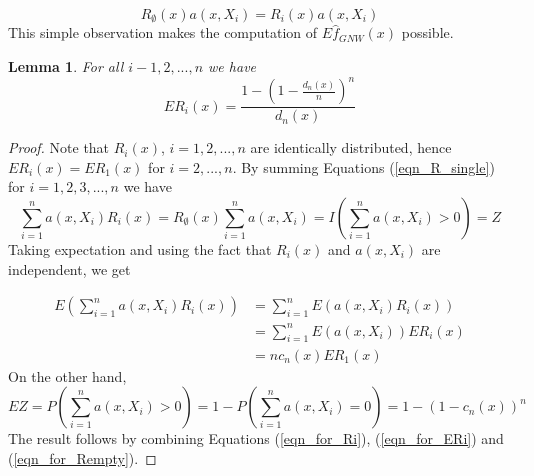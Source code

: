 \documentclass{article}
\newtheorem{lemma}[theorem]{Lemma}
\begin{document}
\begin{equation}
\label{eqn_R_single}
R_{\emptyset}(x)a(x,X_i)=R_{i}(x)a(x,X_i)
\end{equation}
This simple observation makes the computation of $E\hat{f}_{GNW}(x)$  possible.
\begin{lemma}
\label{lemma_exp}
For all $i-1,2,...,n$ we have
\begin{equation*}
    ER_i(x)=\frac{1-(1-\frac{d_n(x)}{n})^n}{d_n(x)}
\end{equation*}
\end{lemma}
\begin{proof}
Note that $R_i(x)$, $i=1,2,...,n$ are identically distributed, hence  $ER_i(x)=ER_1(x)$ for $i=2,...,n$.
By summing Equations (\ref{eqn_R_single}) for $i=1,2,3,...,n$ we have 
\begin{equation}
\label{eqn_for_Ri}
    \sum_{i=1}^n a(x,X_i)R_i(x)=R_{\emptyset}(x)\sum_{i=1}^n a(x,X_i)=I(\sum_{i=1}^n a(x,X_i)>0)=Z
\end{equation}
Taking expectation and using the fact that $R_i(x)$ and $a(x,X_i)$ are independent, we get

\begin{equation}
\label{eqn_for_ERi}
\begin{split}
    E(\sum_{i=1}^n a(x,X_i)R_i(x))&=\sum_{i=1}^n E(a(x,X_i)R_i(x))\\
    &=\sum_{i=1}^n E(a(x,X_i))ER_i(x)\\
    &=nc_n(x)ER_1(x)
\end{split}
\end{equation}
On the other hand,
\begin{equation}
\label{eqn_for_Rempty}
    EZ=P(\sum_{i=1}^n a(x,X_i)>0)=1-P(\sum_{i=1}^n a(x,X_i)=0)=1-(1-c_n(x))^n
\end{equation}
The result follows by combining Equations (\ref{eqn_for_Ri}), (\ref{eqn_for_ERi}) and (\ref{eqn_for_Rempty}).

\end{proof}
\end{document}
